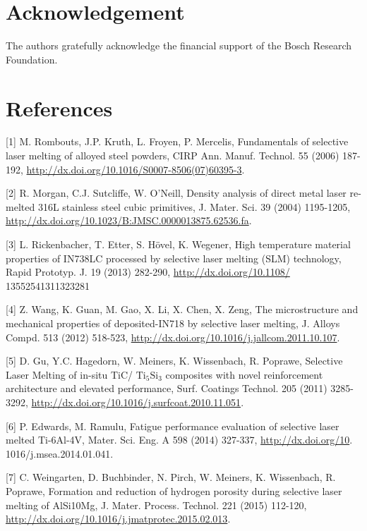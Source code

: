 \documentclass[10pt]{article}
\begin{document}
\section*{Acknowledgement}
The authors gratefully acknowledge the financial support of the Bosch Research Foundation.

\section*{References}
[1] M. Rombouts, J.P. Kruth, L. Froyen, P. Mercelis, Fundamentals of selective laser melting of alloyed steel powders, CIRP Ann. Manuf. Technol. 55 (2006) 187-192, \href{http://dx.doi.org/10.1016/S0007-8506(07)60395-3}{http://dx.doi.org/10.1016/S0007-8506(07)60395-3}.

[2] R. Morgan, C.J. Sutcliffe, W. O’Neill, Density analysis of direct metal laser re-melted 316L stainless steel cubic primitives, J. Mater. Sci. 39 (2004) 1195-1205, \href{http://dx.doi.org/10.1023/B:JMSC.0000013875.62536.fa}{http://dx.doi.org/10.1023/B:JMSC.0000013875.62536.fa}.

[3] L. Rickenbacher, T. Etter, S. Hövel, K. Wegener, High temperature material properties of IN738LC processed by selective laser melting (SLM) technology, Rapid Prototyp. J. 19 (2013) 282-290, \href{http://dx.doi.org/10.1108/}{http://dx.doi.org/10.1108/} 13552541311323281

[4] Z. Wang, K. Guan, M. Gao, X. Li, X. Chen, X. Zeng, The microstructure and mechanical properties of deposited-IN718 by selective laser melting, J. Alloys Compd. 513 (2012) 518-523, \href{http://dx.doi.org/10.1016/j.jallcom.2011.10.107}{http://dx.doi.org/10.1016/j.jallcom.2011.10.107}.

[5] D. Gu, Y.C. Hagedorn, W. Meiners, K. Wissenbach, R. Poprawe, Selective Laser Melting of in-situ TiC/ $\mathrm{Ti}_{5} \mathrm{Si}_{3}$ composites with novel reinforcement architecture and elevated performance, Surf. Coatings Technol. 205 (2011) 3285-3292, \href{http://dx.doi.org/10.1016/j.surfcoat.2010.11.051}{http://dx.doi.org/10.1016/j.surfcoat.2010.11.051}.

[6] P. Edwards, M. Ramulu, Fatigue performance evaluation of selective laser melted Ti-6Al-4V, Mater. Sci. Eng. A 598 (2014) 327-337, \href{http://dx.doi.org/10}{http://dx.doi.org/10}. 1016/j.msea.2014.01.041.

[7] C. Weingarten, D. Buchbinder, N. Pirch, W. Meiners, K. Wissenbach, R. Poprawe, Formation and reduction of hydrogen porosity during selective laser melting of AlSi10Mg, J. Mater. Process. Technol. 221 (2015) 112-120, \href{http://dx.doi.org/10.1016/j.jmatprotec.2015.02.013}{http://dx.doi.org/10.1016/j.jmatprotec.2015.02.013}.
\end{document}
